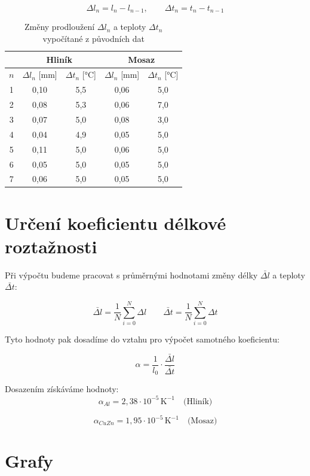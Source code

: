 \documentclass[a4paper,12pt]{article}
\begin{document}
$$
\Delta l_n = l_n - l_{n-1}, \qquad
\Delta t_n = t_n - t_{n-1}
$$

\begin{table}[H]
\centering
\renewcommand{\arraystretch}{1.5}
\begin{tabular}{|c|c|c|c|c|}
\hline
 & \multicolumn{2}{c|}{\textbf{Hliník}} & \multicolumn{2}{c|}{\textbf{Mosaz}} \\
\hline
$n$ & $\Delta l_n$ [mm] & $\Delta t_n$ [°C]
    & $\Delta l_n$ [mm] & $\Delta t_n$ [°C] \\
\hline
1 & 0{,}10 & 5{,}5 & 0{,}06 & 5{,}0 \\
2 & 0{,}08 & 5{,}3 & 0{,}06 & 7{,}0 \\
3 & 0{,}07 & 5{,}0 & 0{,}08 & 3{,}0 \\
4 & 0{,}04 & 4{,}9 & 0{,}05 & 5{,}0 \\
5 & 0{,}11 & 5{,}0 & 0{,}06 & 5{,}0 \\
6 & 0{,}05 & 5{,}0 & 0{,}05 & 5{,}0 \\
7 & 0{,}06 & 5{,}0 & 0{,}05 & 5{,}0 \\
\hline
\end{tabular}
\caption{Změny prodloužení $\Delta l_n$ a teploty $\Delta t_n$ vypočítané z původních dat}
\label{tab:delta_krokova}
\end{table}



\section{Určení koeficientu délkové roztažnosti}
Při výpočtu budeme pracovat s průměrnými hodnotami změny délky $\bar{\Delta l}$ a teploty $\bar{\Delta t}$:

$$
\bar{\Delta l} = \frac{1}{N} \sum_{i=0}^N \Delta l \qquad \bar{\Delta t} = \frac{1}{N} \sum_{i=0}^N \Delta t
$$

Tyto hodnoty pak dosadíme do vztahu pro výpočet samotného koeficientu:

$$
\alpha = \frac{1}{l_0}\cdot \frac{\bar{\Delta l}}{\bar{\Delta t}}
$$

Dosazením získáváme hodnoty:
$$
\alpha_{Al} = 2{,}38 \cdot 10^{-5}\,\mathrm{K}^{-1} \quad \text{(Hliník)}
$$

$$
\alpha_{CuZn} = 1{,}95 \cdot 10^{-5}\,\mathrm{K}^{-1} \quad \text{(Mosaz)}
$$


\section{Grafy}
\end{document}

